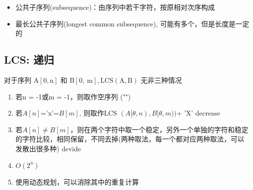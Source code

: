 \begin{itemize}
    \item 公共子序列(subsequence)：由序列中若干字符，按原相对次序构成
    \item 最长公共子序列(longest common subsequence), 可能有多个，但是长度是一定的
\end{itemize}


\subsection{LCS: 递归}
对于序列 $\mathrm{A}[0, \mathrm{n}]$ 和 $\mathrm{B}[0, \mathrm{~m}], \mathrm{LCS}(\mathrm{A}, \mathrm{B})$ 无非三种情况
\begin{enumerate}[label={(\arabic*)}]
\item 若n = -1或m = -1，则取作空序列 ("")
\item 若$ A[n]$='x'=$B[m]$, 则取作LCS $(A[\theta, n), B[\theta, m))$+ 'X' \LR decrease
\item 若$A[n] \neq B[m]$，则在两个字符中取一个稳定，另外一个单独的字符和稳定的字符比较，相同保留，不同去掉(两种取法，每一个都对应两种取法，可以发散出很多种) \LR devide
\item $O(2^n)$
\item 使用动态规划，可以消除其中的重复计算
\end{enumerate}














